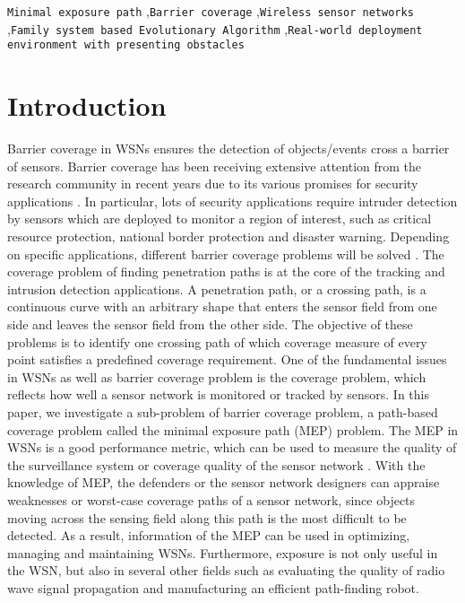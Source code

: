 \documentclass[final]{elsarticle}
\begin{document}
\begin{frontmatter}
\begin{abstract}
\end{abstract}
\begin{keyword}
\texttt{Minimal exposure path} \sep\texttt{Barrier coverage} \sep \texttt{Wireless sensor networks} \sep \texttt{Family system based Evolutionary Algorithm} \sep \texttt{Real-world deployment environment with presenting obstacles}
\end{keyword}
\end{frontmatter}
\section{Introduction}
Barrier coverage in WSNs ensures the detection of objects/events cross a barrier of sensors. Barrier coverage has been receiving extensive attention from the research community in recent years due to its various promises for security applications \cite{wu2016survey,wang2011coverage,b15}. In particular, lots of security applications require intruder detection by sensors which are deployed to monitor a region of interest, such as critical resource protection, national border protection and disaster warning. Depending on specific applications, different barrier coverage problems will be solved . The coverage problem of finding penetration paths is at the core of the tracking and intrusion detection applications. A penetration path, or a crossing path, is a continuous curve with an arbitrary shape that enters the sensor field from one side and leaves the sensor field from the other side. The objective of these problems is to identify one crossing path of which coverage measure of every point satisfies a predefined coverage requirement. One of the fundamental issues in WSNs as well as barrier coverage problem is the coverage problem, which reflects how well a sensor network is monitored or tracked by sensors. In this paper, we investigate a sub-problem of barrier coverage problem, a path-based coverage problem called the minimal exposure path (MEP) problem. The MEP in WSNs is a good performance metric, which can be used to measure the quality of the surveillance system or coverage quality of the sensor network \cite{b13,b17}. With the knowledge of MEP, the defenders or the sensor network designers can appraise weaknesses or worst-case coverage paths of a sensor network, since objects moving across the sensing field along this path is the most difficult to be detected. As a result, information of the MEP can be used in optimizing, managing and maintaining WSNs. Furthermore, exposure is not only useful in the WSN, but also in several other fields such as evaluating the quality of radio wave signal propagation and manufacturing an efficient path-finding robot.
\end{document}
